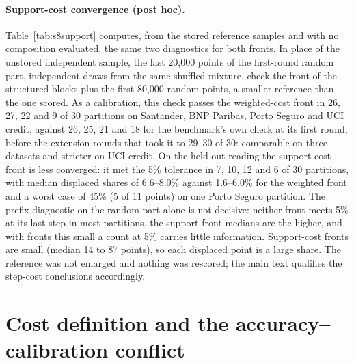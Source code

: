 \documentclass[11pt,a4paper]{article}
\begin{document}
\paragraph{Support-cost convergence (post hoc).} Table~\ref{tab:s8support} computes, from the stored reference
samples and with no composition evaluated, the same two diagnostics for both fronts. In place of the unstored
independent sample, the last 20,000 points of the first-round random part, independent draws from the same shuffled
mixture, check the front of the structured blocks plus the first 80,000 random points, a smaller reference than the
one scored. As a calibration, this check passes the weighted-cost front in 26, 27, 22 and 9 of 30 partitions on
Santander, BNP Paribas, Porto Seguro and UCI credit, against 26, 25, 21 and 18 for the benchmark's own check at its
first round, before the extension rounds that took it to 29--30 of 30: comparable on three datasets and stricter on
UCI credit. On the held-out reading the support-cost front is less converged: it met the 5\% tolerance in 7, 10, 12
and 6 of 30 partitions, with median displaced shares of 6.6--8.0\% against 1.6--6.0\% for the weighted front and a
worst case of 45\% (5 of 11 points) on one Porto Seguro partition. The prefix diagnostic on the random part alone
is not decisive: neither front meets 5\% at its last step in most partitions, the support-front medians are the
higher, and with fronts this small a count at 5\% carries little information.
Support-cost fronts are small (median 14 to 87 points), so each displaced point is a large share. The reference was
not enlarged and nothing was rescored; the main text qualifies the step-cost conclusions accordingly.



\section{Cost definition and the accuracy--calibration conflict}
\label{sec:s9}


\end{document}
